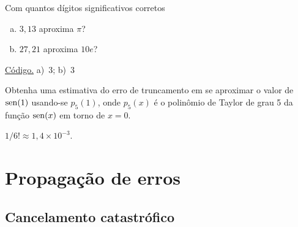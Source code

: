 \begin{exer}\label{exer:dig_corr}
  Com quantos dígitos significativos corretos
  \begin{enumerate}[a)]
  \item $3,13$ aproxima $\pi$?
  \item $27,21$ aproxima $10e$?
  \end{enumerate}
\end{exer}
\begin{resp}
  \ifisoctave 
  \href{https://github.com/phkonzen/notas/blob/master/src/MatematicaNumerica/cap_aritm/dados/exer_dig_corr/exer_dig_corr.m}{Código.} 
  \fi
  a)~$3$; b)~$3$
\end{resp}


\begin{exer}
  Obtenha uma estimativa do erro de truncamento em se aproximar o valor de $\operatorname{sen}(1)$ usando-se $p_5(1)$, onde $p_5(x)$ é o polinômio de Taylor de grau 5 da função $\operatorname{sen}(x)$ em torno de $x=0$.
\end{exer}
\begin{resp}
  $1/6! \approx 1,4\times 10^{-3}$.
\end{resp}

\section{Propagação de erros}\label{cap_aritm_sec_properros}

\subsection{Cancelamento catastrófico}

\emconstrucao